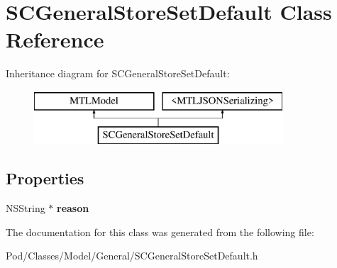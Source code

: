 \hypertarget{interface_s_c_general_store_set_default}{}\section{S\+C\+General\+Store\+Set\+Default Class Reference}
\label{interface_s_c_general_store_set_default}
Inheritance diagram for S\+C\+General\+Store\+Set\+Default\+:\begin{figure}[H]
\begin{center}
\leavevmode
\includegraphics[height=2.000000cm]{interface_s_c_general_store_set_default}
\end{center}
\end{figure}
\subsection*{Properties}
\begin{DoxyCompactItemize}
\item 
N\+S\+String $\ast$ {\bfseries reason}\hypertarget{interface_s_c_general_store_set_default_ab74796fa23c136bdec7f019500b25940}{}\label{interface_s_c_general_store_set_default_ab74796fa23c136bdec7f019500b25940}

\end{DoxyCompactItemize}


The documentation for this class was generated from the following file\+:\begin{DoxyCompactItemize}
\item 
Pod/\+Classes/\+Model/\+General/S\+C\+General\+Store\+Set\+Default.\+h\end{DoxyCompactItemize}
